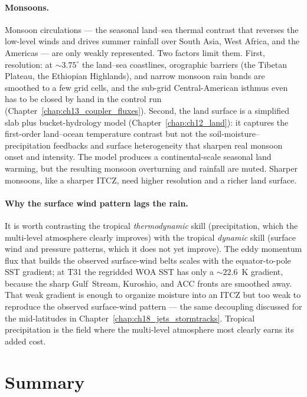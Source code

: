 \paragraph{Monsoons.} Monsoon circulations --- the seasonal land--sea thermal contrast that
reverses the low-level winds and drives summer rainfall over South Asia, West Africa, and the
Americas --- are only weakly represented. Two factors limit them. First, resolution: at
$\sim3.75^\circ$ the land--sea coastlines, orographic barriers (the Tibetan Plateau, the
Ethiopian Highlands), and narrow monsoon rain bands are smoothed to a few grid cells, and the
sub-grid Central-American isthmus even has to be closed by hand in the control run
(Chapter~\ref{chap:ch13_coupler_fluxes}). Second, the land surface is a simplified slab plus
bucket-hydrology model (Chapter~\ref{chap:ch12_land}): it captures the first-order land--ocean
temperature contrast but not the soil-moisture--precipitation feedbacks and surface heterogeneity
that sharpen real monsoon onset and intensity. The model produces a continental-scale seasonal
land warming, but the resulting monsoon overturning and rainfall are muted. Sharper monsoons,
like a sharper ITCZ, need higher resolution and a richer land surface.

\paragraph{Why the surface wind pattern lags the rain.} It is worth contrasting the tropical
\emph{thermodynamic} skill (precipitation, which the multi-level atmosphere clearly improves)
with the tropical \emph{dynamic} skill (surface wind and pressure patterns, which it does not yet
improve). The eddy momentum flux that builds the observed surface-wind belts scales with the
equator-to-pole SST gradient; at T31 the regridded WOA SST has only a $\sim22.6$~K gradient,
because the sharp Gulf~Stream, Kuroshio, and ACC fronts are smoothed away. That weak gradient is
enough to organize moisture into an ITCZ but too weak to reproduce the observed surface-wind
pattern --- the same decoupling discussed for the mid-latitudes in
Chapter~\ref{chap:ch18_jets_stormtracks}. Tropical precipitation is the field where the
multi-level atmosphere most clearly earns its added cost.

\section{Summary}

